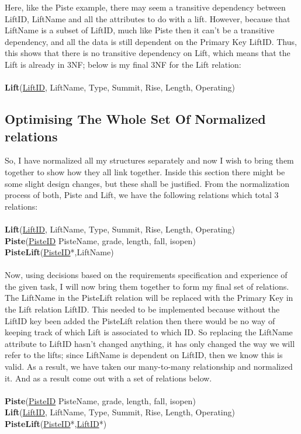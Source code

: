 \documentclass[12pt]{article}
\begin{document}
Here, like the Piste example, there may seem a transitive dependency between LiftID, LiftName and all the attributes to do with a lift. However, because that LiftName is a subset of LiftID, much like Piste then it can't be a transitive dependency, and all the data is still dependent on the Primary Key LiftID. Thus, this shows that there is no transitive dependency on Lift, which means that the Lift is already in 3NF; below is my final 3NF for the Lift relation:~\\\\
\-\hspace{1.8cm}\textbf{Lift}(\uline{LiftID}, LiftName, Type, Summit, Rise, Length, Operating)
\subsection{Optimising The Whole Set Of Normalized relations}
So, I have normalized all my structures separately and now I wish to bring them together to show how they all link together. Inside this section there might be some slight design changes, but these shall be justified. From the normalization process of both, Piste and Lift, we have the following relations which total 3 relations:~\\\\
\-\hspace{1.8cm}\textbf{Lift}(\uline{LiftID}, LiftName, Type, Summit, Rise, Length, Operating)~\\
\-\hspace{1.8cm}\textbf{Piste}(\uline{PisteID} PisteName, grade, length, fall, isopen)~\\
\-\hspace{1.8cm}\textbf{PisteLift}(\uline{PisteID}*,LiftName)~\\\\
Now, using decisions based on the requirements specification and experience of the given task, I will now bring them together to form my final set of relations. The LiftName in the PisteLift relation will be replaced with the Primary Key in the Lift relation LiftID. This needed to be implemented because without the LiftID key been added the PisteLift relation then there would be no way of keeping track of which Lift is associated to which ID. So replacing the LiftName attribute to LiftID hasn't changed anything, it has only changed the way we will refer to the lifts; since LiftName is dependent on LiftID, then we know this is valid. As a result, we have taken our many-to-many relationship and normalized it. And as a result come out with a set of relations below.~\\\\
\-\hspace{1.8cm}\textbf{Piste}(\uline{PisteID} PisteName, grade, length, fall, isopen)~\\
\-\hspace{1.8cm}\textbf{Lift}(\uline{LiftID}, LiftName, Type, Summit, Rise, Length, Operating)~\\
\-\hspace{1.8cm}\textbf{PisteLift}(\uline{PisteID}*,\uline{LiftID}*)
\newpage
\end{document}
